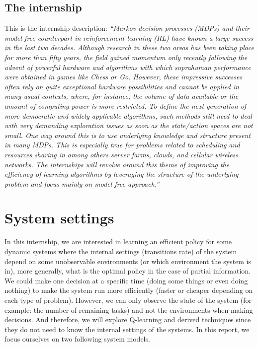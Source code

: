 \documentclass[
  a4paper, xcolor = usenames,dvipsnames]{article}
\theoremstyle{definition}
\theoremstyle{definition}
\theoremstyle{definition}
\theoremstyle{definition}
\theoremstyle{remark}
\begin{document}
\hypertarget{the-internship}{%
\subsection{The internship}\label{the-internship}}

This is the internship description: \emph{``Markov decision processes (MDPs) and their model free counterpart in reinforcement learning (RL) have known a large success in the last two decades. Although research in these two areas has been taking place for more than fifty years, the field gained momentum only recently following the advent of powerful hardware and algorithms with which supra­human performance were obtained in games like Chess or Go. However, these impressive successes often rely on quite exceptional hardware possibilities and cannot be applied in many usual contexts, where, for instance, the volume of data available or the amount of computing power is more restricted. To define the next generation of more democratic and widely applicable algorithms, such methods still need to deal with very demanding exploration issues as soon as the state/action spaces are not small. One way around this is to use underlying knowledge and structure present in many MDPs. This is especially true for problems related to scheduling and resources sharing in among others server farms, clouds, and cellular wireless networks. The internships will revolve around this theme of improving the efficiency of learning algorithms by leveraging the structure of the underlying problem and focus mainly on model ­free approach.''}

\hypertarget{system-settings}{%
\section{System settings}\label{system-settings}}

In this internship, we are interested in learning an efficient policy for some dynamic systems where the internal settings (transitions rate) of the system depend on some unobservable environments (or which environment the system is in), more generally, what is the optimal policy in the case of partial information. We could make one decision at a specific time (doing some things or even doing nothing) to make the system run more efficiently (faster or cheaper depending on each type of problem). However, we can only observe the state of the system (for example: the number of remaining tasks) and not the environments when making decisions. And therefore, we will explore Q-learning and derived techniques since they do not need to know the internal settings of the systems. In this report, we focus ourselves on two following system models.
\end{document}
